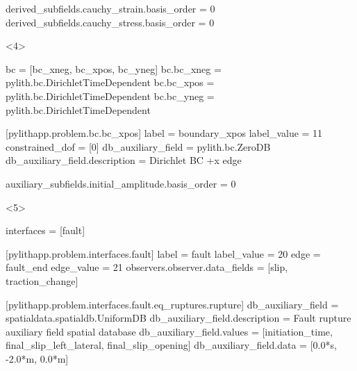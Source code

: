 \documentclass[aspectratio=169]{beamer}
\begin{document}
\begin{frame}[t,fragile]
\begin{minipage}[t]{0.67\textwidth}
\begin{onlyenv}
\begin{cfgcode}
        derived_subfields.cauchy_strain.basis_order = 0
        derived_subfields.cauchy_stress.basis_order = 0
      \end{cfgcode}
    \end{onlyenv}
    \begin{onlyenv}<4>
      \begin{cfgcode}
        bc = [bc_xneg, bc_xpos, bc_yneg]
        bc.bc_xneg = pylith.bc.DirichletTimeDependent
        bc.bc_xpos = pylith.bc.DirichletTimeDependent
        bc.bc_yneg = pylith.bc.DirichletTimeDependent
        
        [pylithapp.problem.bc.bc_xpos]
        label = boundary_xpos
        label_value = 11
        constrained_dof = [0]
        db_auxiliary_field = pylith.bc.ZeroDB
        db_auxiliary_field.description = Dirichlet BC +x edge

        auxiliary_subfields.initial_amplitude.basis_order = 0 
      \end{cfgcode}
    \end{onlyenv}
    \begin{onlyenv}<5>
      \begin{cfgcode}
        interfaces = [fault]

        [pylithapp.problem.interfaces.fault]
        label = fault
        label_value = 20
        edge = fault_end
        edge_value = 21
        observers.observer.data_fields = [slip, traction_change]

        [pylithapp.problem.interfaces.fault.eq_ruptures.rupture]
        db_auxiliary_field = spatialdata.spatialdb.UniformDB
        db_auxiliary_field.description = Fault rupture auxiliary field spatial database
        db_auxiliary_field.values = [initiation_time, final_slip_left_lateral, final_slip_opening]
        db_auxiliary_field.data = [0.0*s, -2.0*m, 0.0*m]
      \end{cfgcode}
    \end{onlyenv}
  \end{minipage}

  
\end{frame}
\end{document}
